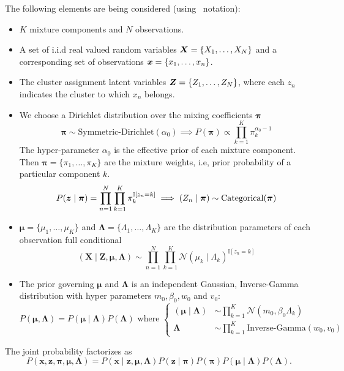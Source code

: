 The following elements are being considered (using~\cite{bishop2006pattern} notation):
\begin{itemize}\setlength\itemsep{1em}
  \item \(K\) mixture components and \(N\) observations.
  \item A set of i.i.d real valued random variables \(\bm{X} = \{X_{1},\dots, X_{N}\}\) and a corresponding set of observations \(\bm{x} = \{x_{1},\dots, x_{n}\}\).
  \item The cluster assignment latent variables \(\bm{Z} = \{Z_{1}, \dots, Z_{N}\}\), where each \(z_{n}\) indicates the cluster to which \( x_n \) belongs. 
  \item We choose a Dirichlet distribution over the mixing coefficients \(\bm{\pi}\)
    \[
    \bm{\pi} \sim \text{Symmetric-Dirichlet}(\alpha_{0}) \implies P(\bm{\pi}) \propto \prod_{k=1}^{K}\pi_{k}^{\alpha_{0}-1}
    \]
    The hyper-parameter \(\alpha_{0}\) is the effective prior of each mixture component. Then \(\bm{\pi} = \{\pi_{1},\dots,\pi_{K}\}\) are the mixture weights, i.e, prior probability of a particular component \(k\).
    \[
    P(\bm{z}\mid \bm{\pi}) = \prod_{n=1}^{N}\prod_{k=1}^{K}\pi_{k}^{\mathbb{I}[z_{n}=k]} \implies (Z_{n} \mid \bm{\pi}) \sim \text{Categorical}(\bm{\pi})
    \]
  \item \(\bm{\mu} = \{\mu_{1},\dots,\mu_{K}\}\) and \(\bm{\Lambda} = \{\Lambda_{1},\dots,\Lambda_{K}\}\) are the distribution parameters of each observation full conditional
    \[
    (\bm{X} \mid \bm{Z}, \bm{\mu}, \bm{\Lambda}) \sim \prod_{n=1}^{N}\prod_{k=1}^{K}\mathcal{N}(\mu_{k} \mid \Lambda_{k})^{\mathbb{I}[z_{n}=k]}
    \]

  \item The prior governing \(\bm{\mu}\) and \(\bm{\Lambda}\) is an independent Gaussian, Inverse-Gamma distribution with hyper parameters \(m_{0}, \beta_{0}, w_{0}\) and \(v_{0}\):
    \[
    P(\bm{\mu}, \bm{\Lambda}) = P(\bm{\mu} \mid \bm{\Lambda})P(\bm{\Lambda}) \text{ where }
    \begin{cases}
      (\bm{\mu}\mid\bm{\Lambda}) &\sim \displaystyle\prod_{k=1}^{K}\mathcal{N}(m_{0}, \beta_{0}\Lambda_{k})\\
      \bm{\Lambda} &\sim \displaystyle\prod_{k=1}^{K}\text{Inverse-Gamma}(w_{0}, v_{0})
      \end{cases}
    \]
\end{itemize}

The joint probability factorizes as
\[
  P(\bm{x}, \bm{z}, \bm{\pi}, \bm{\mu}, \bm{\Lambda}) = P(\bm{x}\mid \bm{z}, \bm{\mu}, \bm{\Lambda})P(\bm{z}\mid \bm{\pi})P(\bm{\pi})P(\bm{\mu}\mid \bm{\Lambda})P(\bm{\Lambda}).
\]

